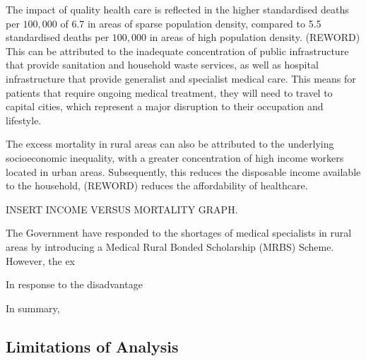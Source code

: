 \documentclass[12pt,a4paper]{article}
\begin{document}
	The impact of quality health care is reflected in the higher standardised deaths per $ 100,000 $ of 6.7 in areas of sparse population density, compared to 5.5 standardised deaths per $ 100,000 $ in areas of high population density. (REWORD) This can be attributed to the inadequate concentration of public infrastructure that provide sanitation and household waste services, as well as hospital infrastructure that provide generalist and specialist medical care. This means for patients that require ongoing medical treatment, they will need to travel to capital cities, which represent a major disruption to their occupation and lifestyle.
	
	The excess mortality in rural areas can also be attributed to the underlying socioeconomic inequality, with a greater concentration of high income workers located in urban areas. Subsequently, this reduces the disposable income available to the household, (REWORD) reduces the affordability of healthcare. 
	
	INSERT INCOME VERSUS MORTALITY GRAPH.
	
	
	The Government have responded to the shortages of medical specialists in rural areas by introducing a Medical Rural Bonded Scholarship (MRBS) Scheme. However, the ex
	
	In response to the disadvantage
	
	
	In summary, 
	\subsection{Limitations of Analysis}
	
\end{document}
